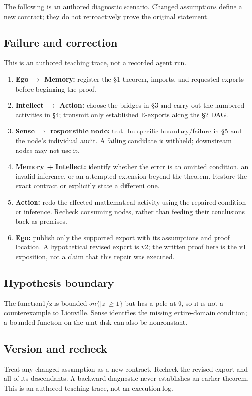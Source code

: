\documentclass[preprint,12pt,aps,pra,showkeys,amsmath,amssymb,superscriptaddress,floatfix]{revtex4-2}
\theoremstyle{definition}
\theoremstyle{remark}
\providecommand{\tightlist}{\setlength{\itemsep}{2pt}\setlength{\parskip}{0pt}}
\begin{document}
The following is an authored diagnostic scenario. Changed assumptions
define a new contract; they do not retroactively prove the original
statement.

\subsection{Failure and correction}
This is an authored teaching trace, not a recorded agent run.

\begin{enumerate}
\def\labelenumi{\arabic{enumi}.}
\tightlist
\item
  \textbf{Ego \(\to\) Memory:} register the §1 theorem, imports, and
  requested exports before beginning the proof.
\item
  \textbf{Intellect \(\to\) Action:} choose the bridges in §3 and carry
  out the numbered activities in §4; transmit only established E-exports
  along the §2 DAG.
\item
  \textbf{Sense \(\to\) responsible node:} test the specific
  boundary/failure in §5 and the node's individual audit. A failing
  candidate is withheld; downstream nodes may not use it.
\item
  \textbf{Memory + Intellect:} identify whether the error is an omitted
  condition, an invalid inference, or an attempted extension beyond the
  theorem. Restore the exact contract or explicitly state a different
  one.
\item
  \textbf{Action:} redo the affected mathematical activity using the
  repaired condition or inference. Recheck consuming nodes, rather than
  feeding their conclusions back as premises.
\item
  \textbf{Ego:} publish only the supported export with its assumptions
  and proof location. A hypothetical revised export is v2; the written
  proof here is the v1 exposition, not a claim that this repair was
  executed.
\end{enumerate}

\subsection{Hypothesis boundary}
The function1/z is bounded \(on\{|z|\ge 1\}\) but has a pole at 0, so it
is not a counterexample to Liouville. Sense identifies the missing
entire-domain condition; a bounded function on the unit disk can also be
nonconstant.

\subsection{Version and recheck}
Treat any changed assumption as a new contract. Recheck the revised
export and all of its descendants. A backward diagnostic never
establishes an earlier theorem. This is an authored teaching trace, not
an execution log.
\end{document}
